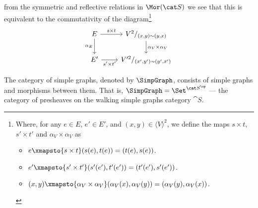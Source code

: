 \begin{definition}
\begin{itemize}
\[      \]
      from the symmetric and reflective relations in \(\Mor(\cat S)\) we see
      that this is equivalent to the commutativity of the diagram\footnote{
        Where, for any \(e \in E\), \(e' \in E'\), and \((x, y) \in \langle V
        \rangle^2\), we define the maps \(s \times t\), \(s' \times t'\) and
        \(\alpha_V \times \alpha_V\) as
        \begin{itemize}
          \setlength\itemsep{0.0em}
          \item \(e \xmapsto{s \times t} (s(e), t(e)) = (t(e), s(e))\).
          \item \(e' \xmapsto{s' \times t'} (s'(e'), t'(e')) = (t'(e'),
            s'(e'))\).
          \item \((x, y) \xmapsto{\alpha_V \times \alpha_V} (\alpha_V(x),
            \alpha_V(y)) = (\alpha_V(y), \alpha_V(x))\).
        \end{itemize}
      }
      \[
        \begin{tikzcd}
          E \ar[r, "s \times t"]
          \ar[d, swap, "\alpha_E"]
          &V^2/_{(x, y) \sim (y, x)}
          \ar[d, "\alpha_V \times \alpha_V"]
          \\
          E' \ar[r, swap, "s' \times t'"] &V'^2/_{(x', y') \sim (y', x')}
        \end{tikzcd}
      \]
  \end{itemize}
\end{definition}

\begin{definition}
  The category of simple graphs, denoted by \(\SimpGraph\), consists of
  simple graphs and morphisms between them. That is, \(\SimpGraph = \Set^{\cat
  S^\op}\) --- the category of presheaves on the walking simple graphs category
  \(\cat S\).
\end{definition}
